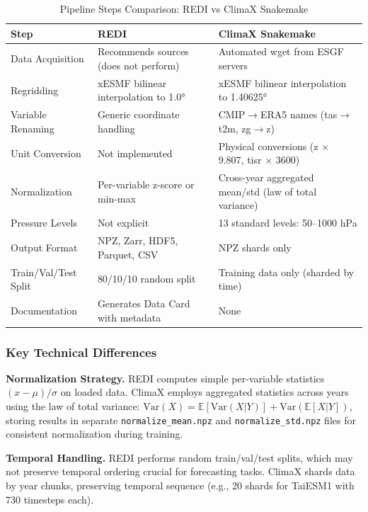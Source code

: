 \begin{table}[htbp]
\centering
\caption{Pipeline Steps Comparison: REDI vs ClimaX Snakemake}
\label{tab:pipeline-steps}
\begin{tabular}{@{}lL{2.2in}L{3.0in}@{}}
\toprule
\textbf{Step} & \textbf{REDI} & \textbf{ClimaX Snakemake} \\
\midrule
Data Acquisition & Recommends sources (does not perform) & Automated wget from ESGF servers \\
\addlinespace
Regridding & xESMF bilinear interpolation to 1.0° & xESMF bilinear interpolation to 1.40625° \\
\addlinespace
Variable Renaming & Generic coordinate handling & CMIP$\rightarrow$ERA5 names (tas$\rightarrow$t2m, zg$\rightarrow$z) \\
\addlinespace
Unit Conversion & Not implemented & Physical conversions (z $\times$ 9.807, tisr $\times$ 3600) \\
\addlinespace
Normalization & Per-variable z-score or min-max & Cross-year aggregated mean/std (law of total variance) \\
\addlinespace
Pressure Levels & Not explicit & 13 standard levels: 50--1000 hPa \\
\addlinespace
Output Format & NPZ, Zarr, HDF5, Parquet, CSV & NPZ shards only \\
\addlinespace
Train/Val/Test Split & 80/10/10 random split & Training data only (sharded by time) \\
\addlinespace
Documentation & Generates Data Card with metadata & None \\
\bottomrule
\end{tabular}
\end{table}

\subsubsection{Key Technical Differences}

\textbf{Normalization Strategy.}
REDI computes simple per-variable statistics $(x - \mu) / \sigma$ on loaded data. ClimaX employs aggregated statistics across years using the law of total variance: $\text{Var}(X) = \mathbb{E}[\text{Var}(X|Y)] + \text{Var}(\mathbb{E}[X|Y])$, storing results in separate \texttt{normalize\_mean.npz} and \texttt{normalize\_std.npz} files for consistent normalization during training.

\textbf{Temporal Handling.}
REDI performs random train/val/test splits, which may not preserve temporal ordering crucial for forecasting tasks. ClimaX shards data by year chunks, preserving temporal sequence (e.g., 20 shards for TaiESM1 with 730 timesteps each).

